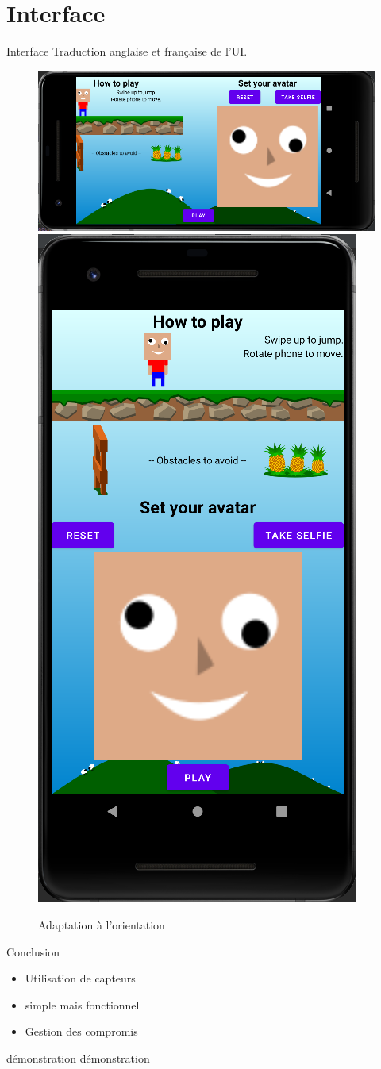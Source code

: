 \documentclass[t,12pt]{beamer}
\begin{document}
\section{Interface}
\begin{frame}{Interface}
Traduction anglaise et française de l'UI.
\begin{figure}
    \includegraphics[width=0.5\linewidth]{images/selfie_horizontal.png}
    \includegraphics[height=0.5\linewidth]{images/selfie_vertical.png}
    \caption{Adaptation à l'orientation}
\end{figure}
\end{frame}

\begin{frame}{Conclusion}
\begin{itemize}
    \item Utilisation de capteurs
    \item simple mais fonctionnel
    \item Gestion des compromis
\end{itemize}
\end{frame}

\begin{frame}{démonstration}
\centering
    \Huge démonstration
\end{frame}
\end{document}
